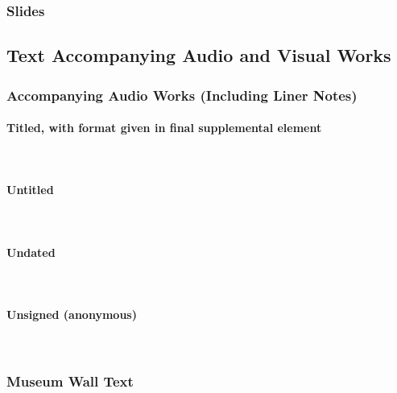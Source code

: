 \documentclass{ltxdockit}
\newcommand{\myparagraph}[1]{\paragraph{#1}\mbox{}\\}
\begin{document}
\subsubsection{Slides} %
\label{sub:slides}
\begin{refsection}
	\printbibliography[heading=none]
\end{refsection}

\subsection{Text Accompanying Audio and Visual Works} %
\label{sec:text_accompanying_audio_and_visual_works}
\subsubsection{ Accompanying Audio Works (Including Liner Notes)} %
\label{sub:_accompanying_audio_works_including_liner_notes}
\begin{refsection}
	\printbibliography[heading=none]
\end{refsection}
\myparagraph{Titled, with format given in final supplemental element} %
\label{ssub:titled_with_format_given_in_final_supplemental_element}
\begin{refsection}
	\printbibliography[heading=none]
\end{refsection}
\myparagraph{Untitled} %
\label{ssub:untitled}
\begin{refsection}
	\printbibliography[heading=none]
\end{refsection}
\myparagraph{Undated} %
\label{ssub:undated}
\begin{refsection}
	\printbibliography[heading=none]
\end{refsection}
\myparagraph{Unsigned (anonymous)} %
\label{ssub:unsigned_anonymous}
\begin{refsection}
	\printbibliography[heading=none]
\end{refsection}
\subsubsection{Museum Wall Text} %
\label{sub:museum_wall_text}
\begin{refsection}
	\printbibliography[heading=none]
\end{refsection}
\end{document}
